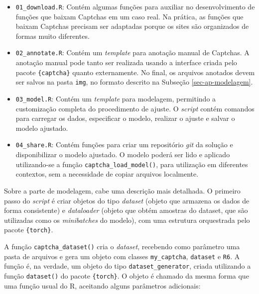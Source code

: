 \documentclass[12pt,twoside,brazilian]{book}
\providecommand{\tightlist}{%
  \setlength{\itemsep}{0pt}\setlength{\parskip}{0pt}}
\begin{document}
\begin{itemize}
\tightlist
\item
  \texttt{01\_download.R}: Contém algumas funções para auxiliar no
  desenvolvimento de funções que baixam Captchas em um caso real. Na
  prática, as funções que baixam Captchas precisam ser adaptadas porque
  os sites são organizados de formas muito diferentes.
\item
  \texttt{02\_annotate.R}: Contém um \emph{template} para anotação
  manual de Captchas. A anotação manual pode tanto ser realizada usando
  a interface criada pelo pacote \texttt{\{captcha\}} quanto
  externamente. No final, os arquivos anotados devem ser salvos na pasta
  \texttt{img}, no formato descrito na Subseção \ref{sec-ap-modelagem}.
\item
  \texttt{03\_model.R}: Contém um \emph{template} para modelagem,
  permitindo a customização completa do procedimento de ajuste. O
  \emph{script} contém comandos para carregar os dados, especificar o
  modelo, realizar o ajuste e salvar o modelo ajustado.
\item
  \texttt{04\_share.R}: Contém funções para criar um repositório
  \emph{git} da solução e disponibilizar o modelo ajustado. O modelo
  poderá ser lido e aplicado utilizando-se a função
  \texttt{captcha\_load\_model()}, para utilização em diferentes
  contextos, sem a necessidade de copiar arquivos localmente.
\end{itemize}

Sobre a parte de modelagem, cabe uma descrição mais detalhada. O
primeiro passo do \emph{script} é criar objetos do tipo \emph{dataset}
(objeto que armazena os dados de forma consistente) e \emph{dataloader}
(objeto que obtém amostras do dataset, que são utilizadas como os
\emph{minibatches} do modelo), com uma estrutura orquestrada pelo pacote
\texttt{\{torch\}}.

A função \texttt{captcha\_dataset()} cria o \emph{dataset}, recebendo
como parâmetro uma pasta de arquivos e gera um objeto com classes
\texttt{my\_captcha}, \texttt{dataset} e \texttt{R6}. A função é, na
verdade, um objeto do tipo \texttt{dataset\_generator}, criada
utilizando a função \texttt{dataset()} do pacote \texttt{\{torch\}}. O
objeto é chamado da mesma forma que uma função usual do R, aceitando
alguns parâmetros adicionais:
\end{document}

